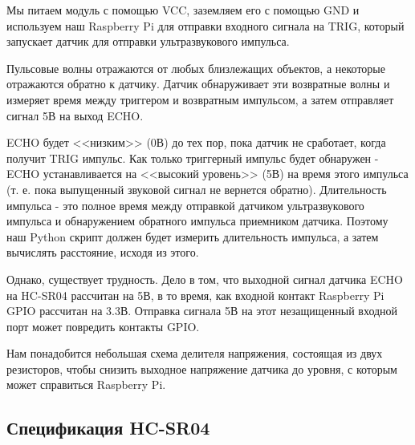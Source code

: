 \documentclass[a4paper, 14pt]{article}
\begin{document}
Мы питаем модуль с помощью VCC, заземляем его с помощью GND и используем наш Raspberry Pi для отправки входного сигнала на TRIG, который запускает датчик для отправки ультразвукового импульса.

Пульсовые волны отражаются от любых близлежащих объектов, а некоторые отражаются обратно к датчику. Датчик обнаруживает эти возвратные волны и измеряет время между триггером и возвратным импульсом, а затем отправляет сигнал 5В на выход ECHO.

ECHO будет <<низким>> (0В) до тех пор, пока датчик не сработает, когда получит TRIG импульс. Как только триггерный импульс будет обнаружен - ECHO устанавливается на <<высокий уровень>> (5В) на время этого импульса (т. е. пока выпущенный звуковой сигнал не вернется обратно). Длительность импульса - это полное время между отправкой датчиком ультразвукового импульса и обнаружением обратного импульса приемником датчика. Поэтому наш Python скрипт должен будет измерить длительность импульса, а затем вычислять расстояние, исходя из этого.

Однако, существует трудность. Дело в том, что выходной сигнал датчика ECHO на HC-SR04 рассчитан на 5В, в то время, как входной контакт Raspberry Pi GPIO рассчитан на 3.3В. Отправка сигнала 5В на этот незащищенный входной порт может повредить контакты GPIO.

Нам понадобится небольшая схема делителя напряжения, состоящая из двух резисторов, чтобы снизить выходное напряжение датчика до уровня, с которым может справиться Raspberry Pi.

\newpage
\subsection{Спецификация HC-SR04}
\end{document}
